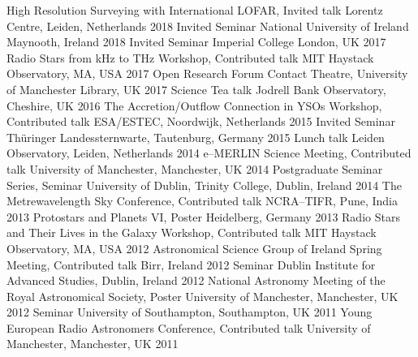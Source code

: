 \begin{cvpress}
   \cvpres
    {High Resolution Surveying with International LOFAR, Invited talk}
    {Lorentz Centre, Leiden, Netherlands}
    {2018}
   \cvpres
    {Invited Seminar}
    {National University of Ireland Maynooth, Ireland}
    {2018}
   \cvpres
    {Invited Seminar}
    {Imperial College London, UK}
    {2017}
   \cvpres
    {Radio Stars from kHz to THz Workshop, Contributed talk}
    {MIT Haystack Observatory, MA, USA}
    {2017}
   \cvpres
    {Open Research Forum}
    {Contact Theatre, University of Manchester Library, UK}
    {2017}
  \cvpres
  {Science Tea talk}
  {Jodrell Bank Observatory, Cheshire, UK}
  {2016}
  \cvpres
    {The Accretion/Outflow Connection in YSOs Workshop, Contributed talk}
    {ESA/ESTEC, Noordwijk, Netherlands}
    {2015}
  \cvpres
    {Invited Seminar}
    {Th{\"u}ringer Landessternwarte, Tautenburg, Germany}
    {2015}
  \cvpres
    {Lunch talk}
    {Leiden Observatory, Leiden, Netherlands}
    {2014}
  \cvpres
    {e--MERLIN Science Meeting, Contributed talk}
    {University of Manchester, Manchester, UK}
    {2014}
  \cvpres
    {Postgraduate Seminar Series, Seminar}
    {University of Dublin, Trinity College, Dublin, Ireland}
    {2014}
   \cvpres
   	{The Metrewavelength Sky Conference, Contributed talk}
    {NCRA--TIFR, Pune, India}
    {2013}
   \cvpres
   	{Protostars and Planets VI, Poster}
    {Heidelberg, Germany}
    {2013}
   \cvpres
   	{Radio Stars and Their Lives in the Galaxy Workshop, Contributed talk}
    {MIT Haystack Observatory, MA, USA}
    {2012}
   \cvpres
   	{Astronomical Science Group of Ireland Spring Meeting, Contributed talk}
    {Birr, Ireland}
    {2012}
   \cvpres
   	{Seminar}
    {Dublin Institute for Advanced Studies, Dublin, Ireland}
    {2012}
   \cvpres
   	{National Astronomy Meeting of the Royal Astronomical Society, Poster}
    {University of Manchester, Manchester, UK}
    {2012}
   \cvpres
   	{Seminar}
    {University of Southampton, Southampton, UK}
    {2011}
   \cvpres
   	{Young European Radio Astronomers Conference, Contributed talk}
    {University of Manchester, Manchester, UK}
    {2011}
\end{cvpress}


